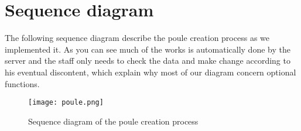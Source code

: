\section{Sequence diagram}

The following sequence diagram describe the poule creation process as we implemented it.
As you can see much of the works is automatically done by the server and the staff only needs to check the data and make change according to his eventual discontent, which explain why most of our diagram concern optional functions.  \newline

\begin{figure}[!ht]
	\centering
	\texttt{[image: poule.png]}
	\caption{Sequence diagram of the poule creation process}
	\label{fig:length_eight_mouse}
\end{figure}
\FloatBarrier